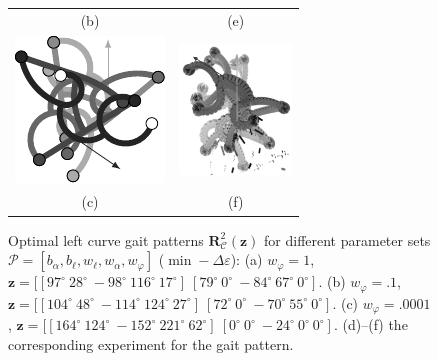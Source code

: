 \documentclass[letterpaper,10pt,conference]{ieeeconf}  %
\begin{document}
\begin{figure}
\begin{center}
\begin{tabular}{cc}
(b) & (e) \\
\includegraphics[scale=1]{../Pics/py/Curve_f_ori_0001.pdf} &
\includegraphics[width=3cm]{../Pics/experiment/curve_c.png} \\
(c) & (f) \\
\end{tabular}


\caption{
Optimal left curve gait patterns $\bm{R}_\mathcal{C}^2(\bm{z})$ for different parameter sets $\mathcal{P} = [b_\alpha, b_\ell, w_\ell, w_\alpha, w_\varphi]$ ($\min -\Delta\varepsilon$):
(a) $w_\varphi = 1$, $\bm{z}=[[97^\circ~28^\circ~-98^\circ~116^\circ~17^\circ]~[79^\circ~0^\circ~-84^\circ~67^\circ~0^\circ]$.
(b) $w_\varphi = .1$, $\bm{z}=[[104^\circ~48^\circ~-114^\circ~124^\circ~27^\circ]~[72^\circ~0^\circ~-70^\circ~55^\circ~0^\circ]$.
(c) $w_\varphi = .0001$, $\bm{z}=[[164^\circ~124^\circ~-152^\circ~221^\circ~62^\circ]~[0^\circ~0^\circ~-24^\circ~0^\circ~0^\circ]$.
(d)--(f) the corresponding experiment for the gait pattern.
}
\label{fig:opt_curve_gait}
\end{center}
\end{figure}
\end{document}
